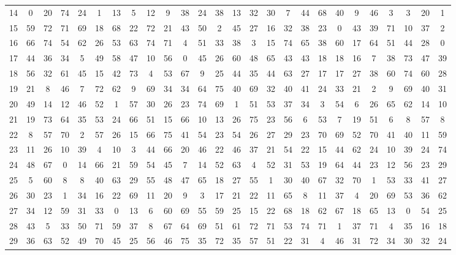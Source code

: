 \begin{table}
\begin{tabular}{c c c c c c c c c c c c c c c c c c c c c c c c c c }
14 & 0 & 20 & 74 & 24 & 1 & 13 & 5 & 12 & 9 & 38 & 24 & 38 & 13 & 32 & 30 & 7 & 44 & 68 & 40 & 9 & 46 & 3 & 3 & 20 & 1 \\
15 & 59 & 72 & 71 & 69 & 18 & 68 & 22 & 72 & 21 & 43 & 50 & 2 & 45 & 27 & 16 & 32 & 38 & 23 & 0 & 43 & 39 & 71 & 10 & 37 & 2 \\
16 & 66 & 74 & 54 & 62 & 26 & 53 & 63 & 74 & 71 & 4 & 51 & 33 & 38 & 3 & 15 & 74 & 65 & 38 & 60 & 17 & 64 & 51 & 44 & 28 & 0 \\
17 & 44 & 36 & 34 & 5 & 49 & 58 & 47 & 10 & 56 & 0 & 45 & 26 & 60 & 48 & 65 & 43 & 43 & 18 & 18 & 16 & 7 & 38 & 73 & 47 & 39 \\
18 & 56 & 32 & 61 & 45 & 15 & 42 & 73 & 4 & 53 & 67 & 9 & 25 & 44 & 35 & 44 & 63 & 27 & 17 & 17 & 27 & 38 & 60 & 74 & 60 & 28 \\
19 & 21 & 8 & 46 & 7 & 72 & 62 & 9 & 69 & 34 & 34 & 64 & 75 & 40 & 69 & 32 & 40 & 41 & 24 & 33 & 21 & 2 & 9 & 69 & 40 & 31 \\
20 & 49 & 14 & 12 & 46 & 52 & 1 & 57 & 30 & 26 & 23 & 74 & 69 & 1 & 51 & 53 & 37 & 34 & 3 & 54 & 6 & 26 & 65 & 62 & 14 & 10 \\
21 & 19 & 73 & 64 & 35 & 53 & 24 & 66 & 51 & 15 & 66 & 10 & 13 & 26 & 75 & 23 & 56 & 6 & 53 & 7 & 19 & 51 & 6 & 8 & 57 & 8 \\
22 & 8 & 57 & 70 & 2 & 57 & 26 & 15 & 66 & 75 & 41 & 54 & 23 & 54 & 26 & 27 & 29 & 23 & 70 & 69 & 52 & 70 & 41 & 40 & 11 & 59 \\
23 & 11 & 26 & 10 & 39 & 4 & 10 & 3 & 44 & 66 & 20 & 46 & 22 & 46 & 37 & 21 & 54 & 22 & 15 & 44 & 62 & 24 & 10 & 39 & 24 & 74 \\
24 & 48 & 67 & 0 & 14 & 66 & 21 & 59 & 54 & 45 & 7 & 14 & 52 & 63 & 4 & 52 & 31 & 53 & 19 & 64 & 44 & 23 & 12 & 56 & 23 & 29 \\
25 & 5 & 60 & 8 & 8 & 40 & 63 & 29 & 55 & 48 & 47 & 65 & 18 & 27 & 55 & 1 & 30 & 40 & 67 & 32 & 70 & 1 & 53 & 33 & 41 & 27 \\
26 & 30 & 23 & 1 & 34 & 16 & 22 & 69 & 11 & 20 & 9 & 3 & 17 & 21 & 22 & 11 & 65 & 8 & 11 & 37 & 4 & 20 & 69 & 53 & 36 & 62 \\
27 & 34 & 12 & 59 & 31 & 33 & 0 & 13 & 6 & 60 & 69 & 55 & 59 & 25 & 15 & 22 & 68 & 18 & 62 & 67 & 18 & 65 & 13 & 0 & 54 & 25 \\
28 & 43 & 5 & 33 & 50 & 71 & 59 & 37 & 8 & 67 & 64 & 69 & 51 & 61 & 72 & 71 & 53 & 74 & 71 & 1 & 37 & 71 & 4 & 35 & 16 & 18 \\
29 & 36 & 63 & 52 & 49 & 70 & 45 & 25 & 56 & 46 & 75 & 35 & 72 & 35 & 57 & 51 & 22 & 31 & 4 & 46 & 31 & 72 & 34 & 30 & 32 & 24 \\

\end{tabular}
\end{table}
